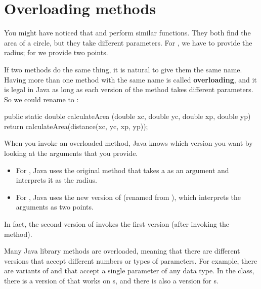 \section{Overloading methods}

You might have noticed that  and  perform similar functions.
They both find the area of a circle, but they take different parameters.
For , we have to provide the radius; for  we provide two points.


If two methods do the same thing, it is natural to give them the same name.
Having more than one method with the same name is called {\bf overloading}, and it is legal in Java as long as each version of the method takes different parameters.
So we could rename  to :

\begin{code}
public static double calculateArea
        (double xc, double yc, double xp, double yp) {
    return calculateArea(distance(xc, yc, xp, yp));
}
\end{code}

When you invoke an overloaded method, Java knows which version you want by looking at the arguments that you provide.

\begin{itemize}

\item For , Java uses the original  method that takes a  as an argument and interprets it as the radius.

\item For , Java uses the new version of  (renamed from ), which interprets the arguments as two points.

\end{itemize}

In fact, the second version of  invokes the first version (after invoking the  method).

Many Java library methods are overloaded, meaning that there are different versions that accept different numbers or types of parameters.
For example, there are variants of  and  that accept a single parameter of any data type.
In the  class, there is a version of  that works on s, and there is also a version for s.

